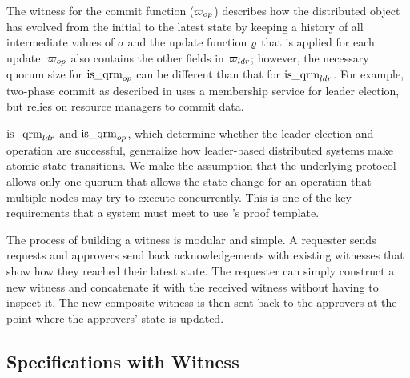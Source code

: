 The witness for the commit function (${\varpi_{op}}$) describes how the distributed
object has evolved from the initial to the latest state by keeping a
history of all intermediate values of $\sigma$ and the update function
$\varrho$ that is applied for each update. ${\varpi_{op}}$ also contains
the other fields in ${\varpi_{ldr}}$; however, the necessary quorum size for $\mathrm{is}\_\mathrm{qrm}_{op}$
can be different than that for $\mathrm{is}\_\mathrm{qrm}_{ldr}$. For example,
two-phase commit as described in  uses
a membership service for leader election, but relies on resource managers to
commit data.

$\mathrm{is}\_\mathrm{qrm}_{ldr}$ and $\mathrm{is}\_\mathrm{qrm}_{op}$, which determine whether the leader 
election and operation are successful, generalize how leader-based distributed 
systems make atomic state transitions. We make the assumption that the underlying
protocol allows only one quorum that allows the state change for an operation 
that multiple nodes may try to execute concurrently. This is one of the key
requirements that a system must meet to use \sysname{}'s proof template.

The process of building a witness is modular and simple. A requester sends
requests and approvers send back acknowledgements with existing witnesses that
show how they reached their latest state.
The requester can simply construct a new witness and concatenate it with the
received witness without having to inspect it.
The new composite witness is then sent back to the approvers at the point where
the approvers' state is updated.

\subsection{Specifications with Witness} 
\label{subsec:specifications-with-witness}

